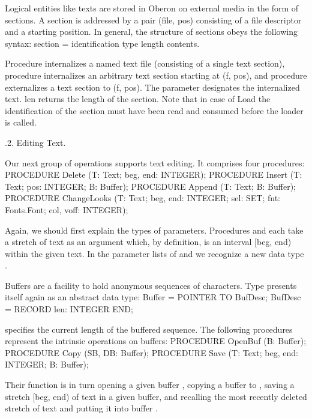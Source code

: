 \noindent Logical entities like texts are stored in Oberon on external media in
the form of sections. A section is addressed by a pair (file, pos)
consisting of a file descriptor and a starting position. In general,
the structure of sections obeys the following syntax:
\begintt
section = identification type length contents.
\endtt

\noindent Procedure  internalizes a named text file (consisting of a single
text section), procedure  internalizes an arbitrary text section
starting at (f, pos), and procedure  externalizes a text section
to (f, pos). The parameter  designates the internalized text. len
returns the length of the section. Note that in case of Load the
identification of the section must have been read and consumed before
the loader is called.

.2. Editing Text.

Our next group of operations supports text editing. It comprises four procedures:
\begintt
PROCEDURE Delete (T: Text; beg, end: INTEGER);
PROCEDURE Insert (T: Text; pos: INTEGER; B: Buffer);
PROCEDURE Append (T: Text; B: Buffer);
PROCEDURE ChangeLooks (T: Text; beg, end: INTEGER; sel: SET; fnt: Fonts.Font; col, voff: INTEGER);
\endtt

\noindent Again, we should first explain the types of parameters. Procedures
 and  each take a stretch of text as an argument
which, by definition, is an interval [beg, end) within the given
text. In the parameter lists of  and  we recognize a new
data type .

Buffers are a facility to hold anonymous sequences of characters. Type
 presents itself again as an abstract data type:
\begintt  
Buffer = POINTER TO BufDesc;
BufDesc = RECORD
  len: INTEGER
END;
\endtt

\noindent {} specifies the current length of the buffered sequence. The
following procedures represent the intrinsic operations on buffers:
\begintt
PROCEDURE OpenBuf (B: Buffer);
PROCEDURE Copy (SB, DB: Buffer);
PROCEDURE Save (T: Text; beg, end: INTEGER; B: Buffer);
\endtt

\noindent Their function is in turn opening a given buffer , copying a buffer
 to , saving a stretch [beg, end) of text in a given buffer, and
recalling the most recently deleted stretch of text and putting it
into buffer .


